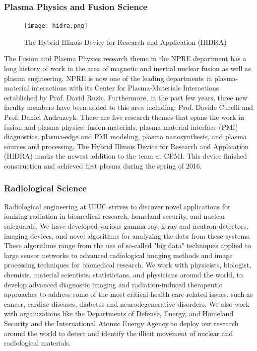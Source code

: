 \subsubsection{Plasma Physics and Fusion Science}
\begin{figure}
  \begin{center}
  \vspace{-\baselineskip}
    \texttt{[image: hidra.png]}
    \caption{The Hybrid Illinois Device for Research and Application (HIDRA)}
  \end{center}
\end{figure}
The Fusion and Plasma Physics research theme in the NPRE department has a long history of work in the area of magnetic and inertial nuclear fusion as well as plasma engineering. NPRE is now one of the leading departments in plasma-material interactions with its Center for Plasma-Materials Interactions established by Prof. David Ruzic. Furthermore, in the past few years, three new faculty members have been added to this area including: Prof. Davide Curelli and Prof. Daniel Andruzcyk. There are five research themes that spans the work in fusion and plasma physics: fusion materials, plasma-material interface (PMI) diagnostics, plasma-edge and PMI modeling, plasma nanosynthesis, and plasma sources and processing. The Hybrid Illinois Device for Research and Application (HIDRA) marks the newest addition to the team at CPMI. This device finished construction and achieved first plasma during the spring of 2016. \\

\subsubsection{Radiological Science}
Radiological engineering at UIUC strives to discover novel applications for ionizing radiation in biomedical research, homeland security, and nuclear safeguards. We have developed various gamma-ray, x-ray and neutron detectors, imaging devices, and novel algorithms for analyzing the data from these systems. These algorithms range from the use of so-called "big data" techniques applied to large sensor networks to advanced radiological imaging methods and image processing techniques for biomedical research. We work with physicists, biologist, chemists, material scientists, statisticians, and physicians around the world, to develop advanced diagnostic imaging and radiation-induced therapeutic approaches to address some of the most critical health care-related issues, such as cancer, cardiac diseases, diabetes and neurodegenerative disorders. We also work with organizations like the Departments of Defense, Energy, and Homeland Security and the International Atomic Energy Agency to deploy our research around the world to detect and identify the illicit movement of nuclear and radiological materials.

